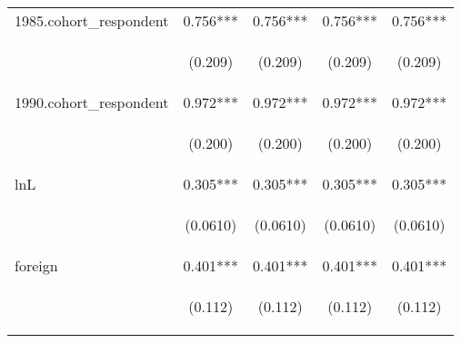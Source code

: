 \begin{center}
\begin{tabular}{lcccc}
1985.cohort\_respondent & 0.756*** & 0.756*** & 0.756*** & 0.756*** \\
\vspace{4pt} & \begin{footnotesize}(0.209)\end{footnotesize} & \begin{footnotesize}(0.209)\end{footnotesize} & \begin{footnotesize}(0.209)\end{footnotesize} & \begin{footnotesize}(0.209)\end{footnotesize} \\
1990.cohort\_respondent & 0.972*** & 0.972*** & 0.972*** & 0.972*** \\
\vspace{4pt} & \begin{footnotesize}(0.200)\end{footnotesize} & \begin{footnotesize}(0.200)\end{footnotesize} & \begin{footnotesize}(0.200)\end{footnotesize} & \begin{footnotesize}(0.200)\end{footnotesize} \\
lnL & 0.305*** & 0.305*** & 0.305*** & 0.305*** \\
\vspace{4pt} & \begin{footnotesize}(0.0610)\end{footnotesize} & \begin{footnotesize}(0.0610)\end{footnotesize} & \begin{footnotesize}(0.0610)\end{footnotesize} & \begin{footnotesize}(0.0610)\end{footnotesize} \\
foreign & 0.401*** & 0.401*** & 0.401*** & 0.401*** \\
\vspace{4pt} & \begin{footnotesize}(0.112)\end{footnotesize} & \begin{footnotesize}(0.112)\end{footnotesize} & \begin{footnotesize}(0.112)\end{footnotesize} & \begin{footnotesize}(0.112)\end{footnotesize} \\

\end{tabular}
\end{center}
